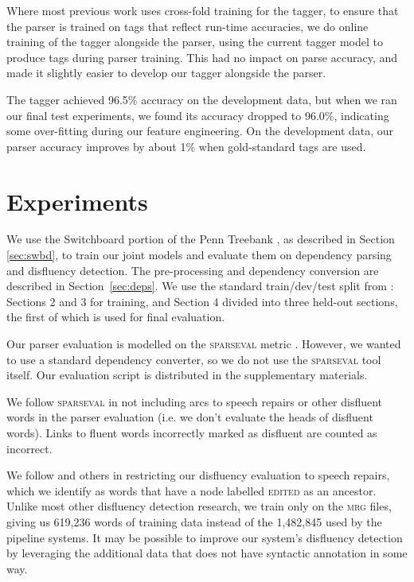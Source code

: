 \documentclass[11pt,letterpaper]{article}
\newcommand{\sparseval}{\textsc{sparseval}\xspace}
\begin{document}
Where most previous work uses cross-fold training for the tagger, to ensure that the
parser is trained on tags that reflect run-time accuracies, we do online training
of the tagger alongside the parser, using the current tagger model to produce
tags during parser training.  This had no impact on parse accuracy, and made it
slightly easier to develop our tagger alongside the parser.

The tagger achieved 96.5\% accuracy on the development data, but when we ran our
final test experiments, we found its accuracy dropped to 96.0\%, indicating
some over-fitting during our feature engineering.  On the development data,
our parser accuracy improves by about 1\% when gold-standard tags are used.

\section{Experiments}

We use the Switchboard portion of the Penn Treebank \citep{marcus:93}, as
described in Section \ref{sec:swbd}, to train our joint
models and evaluate them on dependency parsing and disfluency detection. The
pre-processing and dependency conversion are described in Section~\ref{sec:deps}.
We use the standard train/dev/test split from \citet{Charniak01a}: Sections 2
and 3 for training, and Section 4 divided into three held-out sections, the first
of which is used for final evaluation.

Our parser evaluation is modelled on the \sparseval metric \citep{sparseval}.
However, we wanted to use a standard dependency converter, so we
do not use the \sparseval tool itself.  Our evaluation script is distributed
in the supplementary materials.

We follow \sparseval in not including arcs to speech repairs or other disfluent
words in the parser evaluation (i.e. we don't evaluate the heads of disfluent
words).  Links to fluent words incorrectly marked as disfluent are counted as
incorrect.  

We follow \citet{Johnson04a} and others in restricting our disfluency evaluation
to speech repairs, which we identify as words that have a node labelled \textsc{edited}
as an ancestor.  Unlike most other disfluency detection research, we train only
on the \textsc{mrg} files, giving us 619,236 words of training data instead of
the 1,482,845 used by the pipeline systems.  It may be possible to improve our
system's disfluency detection by leveraging the additional data that does not
have syntactic annotation in some way.
\end{document}
